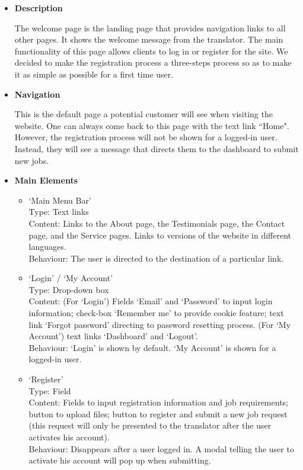 \documentclass{l3proj}
\begin{document}
\begin{itemize}
\item \textbf{Description}

The welcome page is the landing page that provides navigation links to all other pages. It shows the welcome message from the translator.
The main functionality of this page allows clients to log in or register for the site. 
We decided to make the registration process a three-steps process so as to make it as simple as possible for a first time user.

\item \textbf{Navigation}

This is the default page a potential customer will see when visiting the website. One can always come back to this page with the text link ``Home".
However, the registration process will not be shown for a logged-in user. Instead, they will see a message that directs them to the dashboard to submit new jobs.

\item \textbf{Main Elements}
\begin{itemize}
\item `Main Menu Bar'\\
Type: Text links\\
Content: Links to the About page, the Testimonials page, the Contact page, and the Service pages. Links to versions of the website in different languages. \\
Behaviour: The user is directed to the destination of a particular link. \\

\item `Login' / `My Account'\\
Type: Drop-down box\\
Content: (For `Login') Fields `Email' and `Password' to input login information; check-box `Remember me' to provide cookie feature; 
text link `Forgot password' directing to password resetting process. (For `My Account') text links `Dashboard' and `Logout'.\\
Behaviour: `Login' is shown by default. `My Account' is shown for a logged-in user.\\

\item `Register'\\
Type: Field\\
Content: Fields to input registration information and job requirements; button to upload files; 
button to register and submit a new job request (this request will only be presented to the translator after the user activates his account).\\
Behaviour: Disappears after a user logged in. A modal telling the user to activate his account will pop up when submitting. \\
\end{itemize}
\end{itemize}
\end{document}
